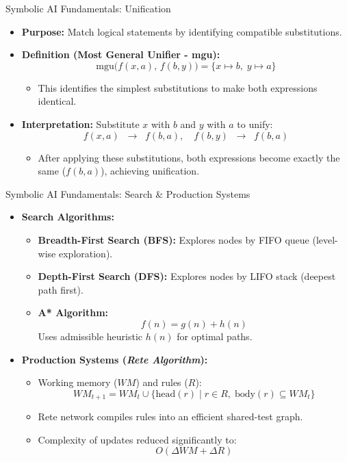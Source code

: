 \documentclass[german,10pt]{beamer}
\begin{document}
\begin{frame}{Symbolic AI Fundamentals: Unification}
  \begin{itemize}
    \item \textbf{Purpose:} Match logical statements by identifying compatible substitutions.

    \item \textbf{Definition (Most General Unifier - mgu):}
    \[
      \mathrm{mgu}\bigl(f(x,a),\,f(b,y)\bigr) = \{x\!\mapsto\!b,\;y\!\mapsto\!a\}
    \]
    \begin{itemize}
      \item This identifies the simplest substitutions to make both expressions identical.
    \end{itemize}

    \item \textbf{Interpretation:}  
    Substitute \(x\) with \(b\) and \(y\) with \(a\) to unify:
    \[
      f(x,a)\;\;\to\;\; f(b,a), \quad f(b,y)\;\;\to\;\;f(b,a)
    \]
    \begin{itemize}
      \item After applying these substitutions, both expressions become exactly the same (\(f(b,a)\)), achieving unification.
    \end{itemize}
  \end{itemize}
\end{frame}



\begin{frame}{Symbolic AI Fundamentals: Search \& Production Systems}
  \begin{itemize}
    \item \textbf{Search Algorithms:}
      \begin{itemize}
        \item \textbf{Breadth-First Search (BFS):} Explores nodes by FIFO queue (level-wise exploration).
        \item \textbf{Depth-First Search (DFS):} Explores nodes by LIFO stack (deepest path first).
        \item \textbf{A* Algorithm:}
          \[
            f(n)=g(n)+h(n)
          \]
          Uses admissible heuristic \(h(n)\) for optimal paths.
      \end{itemize}
    \item \textbf{Production Systems (\textit{Rete Algorithm}):}
      \begin{itemize}
        \item Working memory (\(WM\)) and rules (\(R\)):
          \[
            WM_{t+1} = WM_t \cup \{\mathrm{head}(r)\mid r\in R,\;\mathrm{body}(r)\subseteq WM_t\}
          \]
        \item Rete network compiles rules into an efficient shared-test graph.
        \item Complexity of updates reduced significantly to:
          \[
            O(\Delta WM + \Delta R)
          \]
      \end{itemize}
  \end{itemize}
\end{frame}
\end{document}

